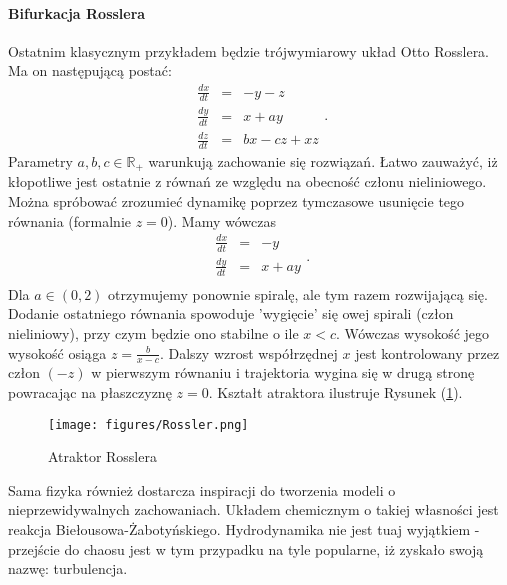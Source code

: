 \documentclass[12pt, twoside]{book}
\begin{document}
\paragraph{Bifurkacja Rosslera}
Ostatnim klasycznym przykładem będzie trójwymiarowy układ Otto Rosslera. Ma on następującą postać:
\begin{equation}
\begin{array}{rcl} 
\frac{dx}{dt} & = & -y-z \\
\frac{dy}{dt} & = & x+ay \\
\frac{dz}{dt} & = & bx-cz+xz
\end{array}.
\end{equation}
Parametry $ a,b,c \in \mathbb{R}_{+} $ warunkują zachowanie się rozwiązań. \newline
Łatwo zauważyć, iż kłopotliwe jest ostatnie z równań ze względu na obecność członu nieliniowego. Można spróbować zrozumieć dynamikę poprzez tymczasowe usunięcie tego równania (formalnie $ z = 0 $). Mamy wówczas
\begin{equation}
\begin{array}{rcl} 
\frac{dx}{dt} & = & -y \\
\frac{dy}{dt} & = & x+ay \\
\end{array}.
\end{equation}
Dla $ a \in (0,2) $ otrzymujemy ponownie spiralę, ale tym razem rozwijającą się. Dodanie ostatniego równania spowoduje 'wygięcie' się owej spirali (człon nieliniowy), przy czym będzie ono stabilne o ile $ x<c $. Wówczas wysokość jego wysokość osiąga $ z = \frac{b}{x-c} $. Dalszy wzrost współrzędnej $ x $ jest kontrolowany przez człon $ (-z) $ w pierwszym równaniu i trajektoria wygina się w drugą stronę powracając na płaszczyznę $ z=0 $. Kształt atraktora ilustruje Rysunek (\ref{Fig11}).
\begin{figure}[H]
	\texttt{[image: figures/Rossler.png]} 
	\centering
	\caption{Atraktor Rosslera}
	\label{Fig11}
\end{figure}
Sama fizyka również dostarcza inspiracji do tworzenia modeli o nieprzewidywalnych zachowaniach. Układem chemicznym o takiej własności jest reakcja Biełousowa-Żabotyńskiego. Hydrodynamika nie jest tuaj wyjątkiem - przejście do chaosu jest w tym przypadku na tyle popularne, iż zyskało swoją nazwę: turbulencja.
\end{document}
